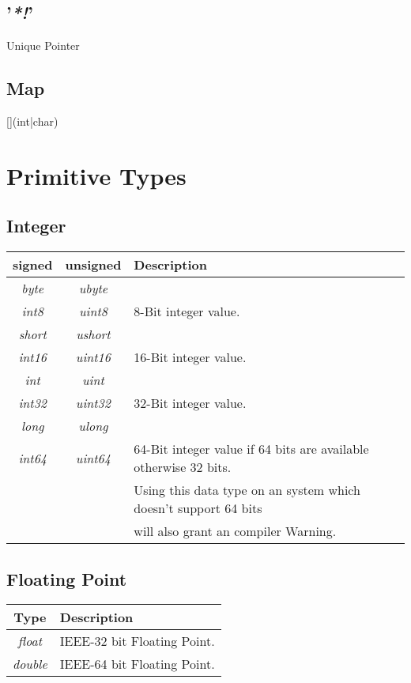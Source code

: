 \documentclass[10pt,a4paper]{article}
\begin{document}
\subsection{'\textit{*!}'}
Unique Pointer


\subsection{Map}
[](int|char)


\section{Primitive Types}


\subsection{Integer}
\begin{tabular}{c|c|l}
signed			& unsigned			 	& Description\\ \hline \hline
\textit{byte}	& \textit{ubyte}		&  \\
\textit{int8}	& \textit{uint8}		& 8-Bit integer value. \\ \hline

\textit{short}	& \textit{ushort}		&  \\
\textit{int16}	& \textit{uint16}		& 16-Bit integer value. \\ \hline

\textit{int}	& \textit{uint}			&  \\
\textit{int32}	& \textit{uint32}		& 32-Bit integer value. \\ \hline

\textit{long}	& \textit{ulong}		&  \\
\textit{int64}	& \textit{uint64}		& 64-Bit integer value if 64 bits are available otherwise 32 bits. \\
				&						& Using this data type on an system which doesn't support 64 bits \\
				&						& will also grant an compiler Warning. \\
\end{tabular}


\subsection{Floating Point}

\begin{tabular}{c|l}
Type			& Description \\ \hline
\textit{float}	& IEEE-32 bit Floating Point. \\
\textit{double}	& IEEE-64 bit Floating Point. \\
\end{tabular}
\end{document}
